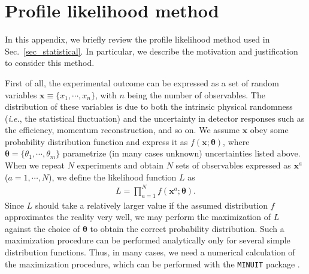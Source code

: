\documentclass[12pt,twoside,book]{article}
\begin{document}
\section{Profile likelihood method}
\label{sec:profile}

\vskip 0.1in

In this appendix, we briefly review the profile likelihood method used in Sec.~\ref{sec_statistical}.
In particular, we describe the motivation and justification to consider this method.

First of all, the experimental outcome can be expressed as a set of random variables $\bm{x} \equiv \{ x_1, \cdots, x_n \}$, with $n$ being the number of observables.
The distribution of these variables is due to both the intrinsic physical randomness (\textit{i.e.}, the statistical fluctuation) and the uncertainty in detector responses such as the efficiency, momentum reconstruction, and so on.
We assume $\bm{x}$ obey some probability distribution function and express it as $f(\bm{x} ; \bm{\theta})$, where $\bm{\theta} = \{ \theta_1, \cdots, \theta_m \}$ parametrize (in many cases unknown) uncertainties listed above.
When we repeat $N$ experiments and obtain $N$ sets of observables expressed as $\bm{x}^a$ ($a = 1,\cdots,N$), we define the likelihood function $L$ as
\begin{align}
  L = \prod_{a=1}^N f(\bm{x}^a ; \bm{\theta}).
\end{align}
Since $L$ should take a relatively larger value if the assumed distribution $f$ approximates the reality very well, we may perform the maximization of $L$ against the choice of $\bm{\theta}$ to obtain the correct probability distribution.
Such a maximization procedure can be performed analytically only for several simple distribution functions.
Thus, in many cases, we need a numerical calculation of the maximization procedure, which can be performed with the \texttt{MINUIT} package \cite{James:1994vla}.
\end{document}

